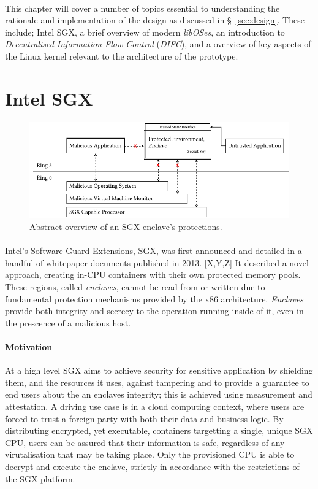 
\paragraph{} This chapter will cover a number of topics essential to understanding the rationale and implementation of the design as discussed in §~\ref{sec:design}. These include; Intel SGX, a brief overview of modern \textit{libOSes}, an introduction to \textit{Decentralised Information Flow Control} (\textit{DIFC}), and a overview of key aspects of the Linux kernel relevant to the architecture of the prototype.

\section{Intel SGX}

\begin{figure}[]
    \centering
    \includegraphics[width=0.9\linewidth]{figures/SGX-architecture.pdf}
    \caption{Abstract overview of an SGX enclave's protections.}
    \label{fig:sgx-basic}
\end{figure}

\paragraph{} Intel's Software Guard Extensions, SGX, was first announced and detailed in a handful of whitepaper documents published in 2013. [X,Y,Z] It described a novel approach, creating in-CPU containers with their own protected memory pools. These regions, called \textit{enclaves}, cannot be read from or written due to fundamental protection mechanisms provided by the x86 architecture. \textit{Enclaves} provide both integrity and secrecy to the operation running inside of it, even in the prescence of a malicious host.

\paragraph{Motivation} At a high level SGX aims to achieve security for sensitive application by shielding them, and the resources it uses, against tampering and to provide a guarantee to end users about the an enclaves integrity; this is achieved using measurement and attestation. A driving use case is in a cloud computing context, where users are forced to trust a foreign party with both their data and business logic. By distributing encrypted, yet executable, containers targetting a single, unique SGX CPU, users can be assured that their information is safe, regardless of any virutalisation that may be taking place. Only the provisioned CPU is able to decrypt and execute the enclave, strictly in accordance with the restrictions of the SGX platform.

